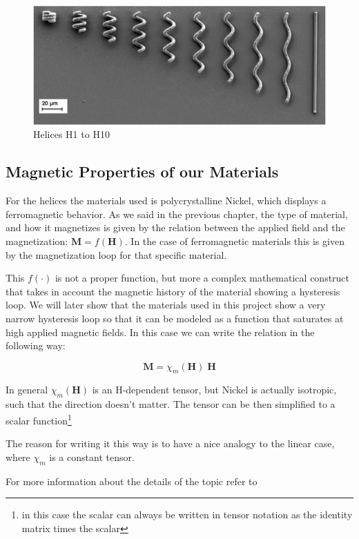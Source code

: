 \begin{figure}[ht]
	\centering
  \includegraphics[width=1\textwidth]{Pictures/Helices.png}
	\caption{Helices H1 to H10}
	\label{fig:Helices}
\end{figure}


\subsection{Magnetic Properties of our Materials}

For the helices the materials used is polycrystalline Nickel, which displays a ferromagnetic behavior. As we said in the previous chapter, the type of material, and how it magnetizes is given by the relation between the applied field and the magnetization: $\textbf{M} = f(\textbf{H})$. In the case of ferromagnetic materials this is given by the magnetization loop for that specific material.

This $f(\cdot)$ is not a proper function, but more a complex mathematical construct that takes in account the magnetic history of the material showing a hysteresis loop. We will later show that the materials used in this project show a very narrow hysteresis loop so that it can be modeled as a function that saturates at high applied magnetic fields. In this case we can write the relation in the following way:

\begin{equation}
\textbf{M} = \chi_m(\textbf{H})\;\textbf{H}
\end{equation}

In general $\chi_m(\textbf{H})$ is an H-dependent tensor, but Nickel is actually isotropic, such that the direction doesn't matter. The tensor can be then simplified to a scalar function\footnote{in this case the scalar can always be written in tensor notation as the identity matrix times the scalar}

The reason for writing it this way is to have a nice analogy to the linear case, where $\chi_m$ is a constant tensor.

For more information about the details of the topic refer to \cite{Cullity2009}




